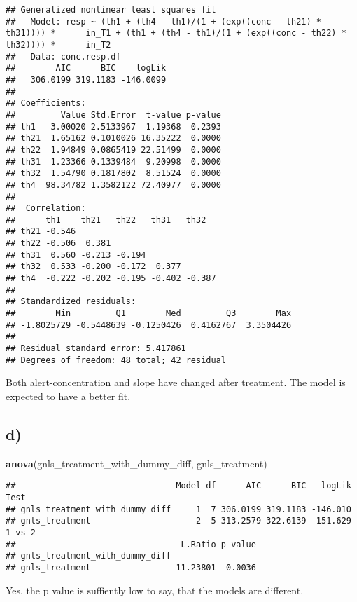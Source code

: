 \documentclass[
]{article}
\newenvironment{Shaded}{\begin{snugshade}}{\end{snugshade}}
\newcommand{\FunctionTok}[1]{\textcolor[rgb]{0.13,0.29,0.53}{\textbf{#1}}}
\newcommand{\NormalTok}[1]{#1}
\begin{document}
\begin{verbatim}
## Generalized nonlinear least squares fit
##   Model: resp ~ (th1 + (th4 - th1)/(1 + (exp((conc - th21) * th31)))) *      in_T1 + (th1 + (th4 - th1)/(1 + (exp((conc - th22) * th32)))) *      in_T2 
##   Data: conc.resp.df 
##        AIC      BIC    logLik
##   306.0199 319.1183 -146.0099
## 
## Coefficients:
##         Value Std.Error  t-value p-value
## th1   3.00020 2.5133967  1.19368  0.2393
## th21  1.65162 0.1010026 16.35222  0.0000
## th22  1.94849 0.0865419 22.51499  0.0000
## th31  1.23366 0.1339484  9.20998  0.0000
## th32  1.54790 0.1817802  8.51524  0.0000
## th4  98.34782 1.3582122 72.40977  0.0000
## 
##  Correlation: 
##      th1    th21   th22   th31   th32  
## th21 -0.546                            
## th22 -0.506  0.381                     
## th31  0.560 -0.213 -0.194              
## th32  0.533 -0.200 -0.172  0.377       
## th4  -0.222 -0.202 -0.195 -0.402 -0.387
## 
## Standardized residuals:
##        Min         Q1        Med         Q3        Max 
## -1.8025729 -0.5448639 -0.1250426  0.4162767  3.3504426 
## 
## Residual standard error: 5.417861 
## Degrees of freedom: 48 total; 42 residual
\end{verbatim}

Both alert-concentration and slope have changed after treatment. The
model is expected to have a better fit.

\hypertarget{d}{%
\subsection{d)}\label{d}}

\begin{Shaded}
\begin{Highlighting}[]
\FunctionTok{anova}\NormalTok{(gnls\_treatment\_with\_dummy\_diff, gnls\_treatment)}
\end{Highlighting}
\end{Shaded}

\begin{verbatim}
##                                Model df      AIC      BIC   logLik   Test
## gnls_treatment_with_dummy_diff     1  7 306.0199 319.1183 -146.010       
## gnls_treatment                     2  5 313.2579 322.6139 -151.629 1 vs 2
##                                 L.Ratio p-value
## gnls_treatment_with_dummy_diff                 
## gnls_treatment                 11.23801  0.0036
\end{verbatim}

Yes, the p value is suffiently low to say, that the models are
different.
\end{document}
